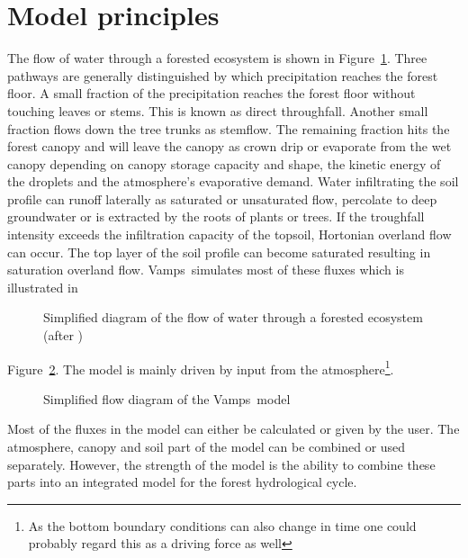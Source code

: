 \documentclass[11pt]{book}
\newcommand{\vamps}{{\sf Vamps}}
\begin{document}
\section*{Model principles}
The flow of water through a forested ecosystem is shown in
Figure~\ref{fig:fcycle}. Three pathways are generally distinguished
by which precipitation reaches the forest floor. A small fraction of
the precipitation reaches the forest floor without touching leaves or
stems. This is known as direct throughfall. Another small fraction
flows down the tree trunks as stemflow. The remaining fraction hits
the forest canopy and will leave the canopy as crown drip or evaporate
from the wet canopy depending on canopy storage capacity and shape, the
kinetic energy of the droplets and the atmosphere's evaporative demand.
Water infiltrating the soil profile can runoff laterally as saturated
or unsaturated flow, percolate to deep groundwater or is extracted
by the roots of plants or trees. If the troughfall intensity exceeds
the infiltration capacity of the topsoil, Hortonian overland flow can
occur. The top layer of the soil profile can become saturated resulting
in saturation overland flow. \vamps\ simulates most of these fluxes
which is illustrated in
\begin{figure}
\centerline{}
\caption{Simplified diagram of the flow of water through a forested
ecosystem (after \protect{})}
\label{fig:fcycle}
\end{figure}
Figure~\ref{fig:vflow}.
The model is mainly driven by input from the atmosphere\footnote{As the
bottom boundary conditions can also change in time one could probably
regard this as a driving force as well}.
\begin{figure}
\centerline{}
\caption{Simplified flow diagram of the \vamps\ model}
\label{fig:vflow}
\end{figure}

Most of the fluxes in the model can either be calculated or given by
the user. The atmosphere, canopy and soil part of the model can be
combined or used separately. However, the strength of the model is the
ability to combine  these parts into an integrated model for the forest
hydrological cycle.
\end{document}
